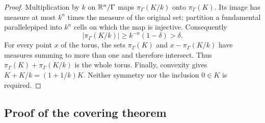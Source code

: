 \begin{proof}
Multiplication by $k$ on $\mathbb R^n/\Gamma$ maps $\pi_\Gamma(K/k)$
onto $\pi_\Gamma(K)$. Its image has measure at most $k^n$ times
the measure of the original set: partition a fundamental
parallelepiped into $k^n$ cells on which the map is injective.
Consequently
\[
 |\pi_\Gamma(K/k)|\ge k^{-n}(1-\delta)>\delta.
\]
For every point $x$ of the torus, the sets $\pi_\Gamma(K)$ and
$x-\pi_\Gamma(K/k)$ have measures summing to more than one and
therefore intersect. Thus
$\pi_\Gamma(K)+\pi_\Gamma(K/k)$ is the whole torus.
Finally, convexity gives $K+K/k=(1+1/k)K$. Neither symmetry nor
the inclusion $0\in K$ is required.
\end{proof}

\subsection{Proof of the covering theorem}

